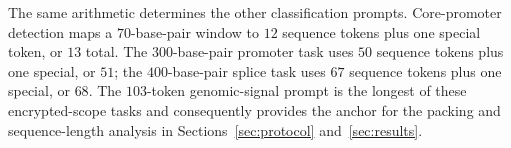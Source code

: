 The same arithmetic determines the other classification prompts. Core-promoter detection maps a
$70$-base-pair window to $12$ sequence tokens plus one special token, or $13$ total. The
$300$-base-pair promoter task uses $50$ sequence tokens plus one special, or $51$; the
$400$-base-pair splice task uses $67$ sequence tokens plus one special, or $68$. The
$103$-token genomic-signal prompt is the longest of these encrypted-scope tasks and consequently
provides the anchor for the packing and sequence-length analysis in Sections~\ref{sec:protocol}
and~\ref{sec:results}.
